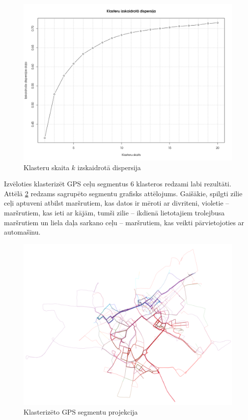 \documentclass{ludis}
\begin{document}
\begin{figure}
  \centering
  \includegraphics[scale=0.45]{img/kmeans_elbow}
  \caption{Klasteru skaita $k$ izskaidrotā dispersija}
  \label{fig:kmeans_elbow}
\end{figure}

Izvēloties klasterizēt GPS ceļu segmentus $6$ klasteros redzami labi rezultāti. Attēlā 
\ref{fig:clustered_trails} redzams sagrupēto segmentu grafisks attēlojums. Gaišākie, 
spilgti zilie ceļi aptuveni atbilst maršrutiem, kas datos ir mēroti ar divriteni, violetie -- 
maršrutiem, kas ieti ar kājām, tumši zilie -- ikdienā lietotajiem trolejbusa maršrutiem un liela daļa
sarkano ceļu -- maršrutiem, kas veikti pārvietojoties ar automašīnu.

\begin{figure}
  \centering
  \includegraphics[scale=0.45]{img/clustered_trails}
  \caption{Klasterizēto GPS segmentu projekcija}
  \label{fig:clustered_trails}
\end{figure}
\end{document}
